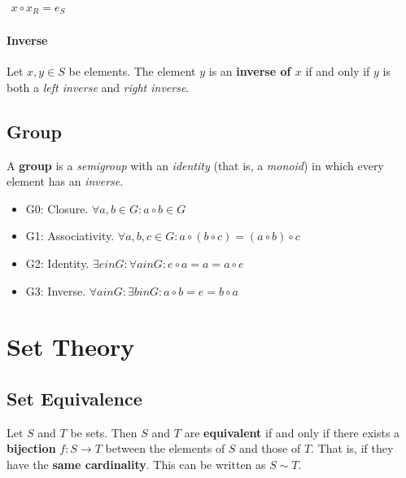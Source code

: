 \begin{math}
  \begin{array}{c}
    x \circ x_R = e_S
  \end{array}
\end{math}

\paragraph{Inverse}

Let $x , y \in S $ be elements. The element $y$ is an \textbf{inverse
  of $x$} if and only if $y$ is both a \textit{left inverse} and
\textit{right inverse}.


\subsection{Group}
\label{sec:group}

A \textbf{group} is a \textit{semigroup} with an \textit{identity}
(that is, a \textit{monoid}) in which every element has an
\textit{inverse}.

\begin{itemize}
\item G0: Closure. $ \forall a, b \in G: a \circ b \in G$
\item G1: Associativity. $ \forall a, b, c \in G: a \circ (b \circ c) = (a \circ b) \circ c $
\item G2: Identity. $\exists e in G : \forall a in G: e \circ a = a = a \circ e $
\item G3: Inverse. $\forall a in G: \exists b in G: a \circ b = e = b \circ a$
\end{itemize}

\newpage
\section{Set Theory}
\label{sec:set-theory}

\subsection{Set Equivalence}
\label{sec:set-eq}

Let $S$ and $T$ be sets. Then $S$ and $T$ are \textbf{equivalent} if
and only if there exists a \textbf{bijection} $f : S \to T$ between
the elements of $S$ and those of $T$. That is, if they have the
\textbf{same cardinality}. This can be written as $S \sim T$.


